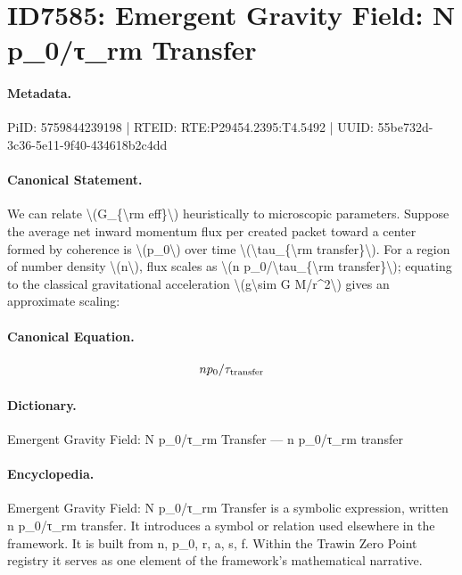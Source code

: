 \section*{ID7585: Emergent Gravity Field: N p\_0/τ\_rm Transfer}
\paragraph{Metadata.}
PiID: 5759844239198 | RTEID: RTE:P29454.2395:T4.5492 | UUID: 55be732d-3c36-5e11-9f40-434618b2c4dd

\paragraph{Canonical Statement.}
We can relate \textbackslash{}(G\_\{\textbackslash{}rm eff\}\textbackslash{}) heuristically to microscopic parameters. Suppose the average net inward momentum flux per created packet toward a center formed by coherence is \textbackslash{}(p\_0\textbackslash{}) over time \textbackslash{}(\textbackslash{}tau\_\{\textbackslash{}rm transfer\}\textbackslash{}). For a region of number density \textbackslash{}(n\textbackslash{}), flux scales as \textbackslash{}(n p\_0/\textbackslash{}tau\_\{\textbackslash{}rm transfer\}\textbackslash{}); equating to the classical gravitational acceleration \textbackslash{}(g\textbackslash{}sim G M/r\textasciicircum{}2\textbackslash{}) gives an approximate scaling:

\paragraph{Canonical Equation.}
\[
n p_0/\tau_{\rm transfer}
\]

\paragraph{Dictionary.}
Emergent Gravity Field: N p\_0/τ\_rm Transfer — n p\_0/τ\_rm transfer

\paragraph{Encyclopedia.}
Emergent Gravity Field: N p\_0/τ\_rm Transfer is a symbolic expression, written n p\_0/τ\_rm transfer. It introduces a symbol or relation used elsewhere in the framework. It is built from n, p\_0, r, a, s, f. Within the Trawin Zero Point registry it serves as one element of the framework's mathematical narrative.
